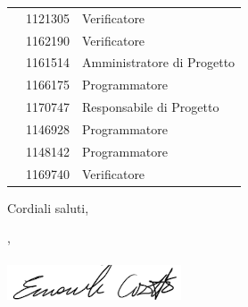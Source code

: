 \documentclass[12pt]{letter}
\begin{document}
\begin{letter}
{\begin{longtable}{ C{4cm} C{3cm} C{6cm} }
                \endhead 
                \MC{} & 1121305 & Verificatore \\
                \LD{} & 1162190 & Verificatore \\
                \CE{} & 1161514 & Amministratore di Progetto \\
                \SE{} & 1166175 & Programmatore \\
                \PF{} & 1170747 & Responsabile di Progetto \\
                \DF{} & 1146928 & Programmatore \\
                \BR{} & 1148142 & Programmatore \\
                \AT{} & 1169740 & Verificatore \\  
            \end{longtable}
        }
        Cordiali saluti,
        \closing{\CE{}, \\ \textit{\Responsabile{}}\\ \includegraphics[width=.6\linewidth]{../DocumentazioneEsterna/PianoDiProgetto/Sezioni/Immagini/Firme/Emanuele.png}}
        \vspace{10mm}
    \end{letter}
\end{document}
